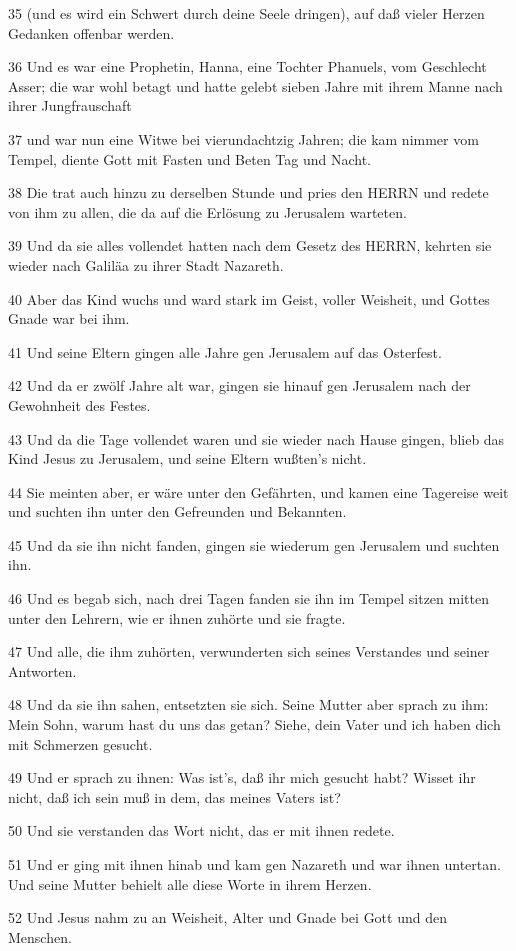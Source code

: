 \par 35 (und es wird ein Schwert durch deine Seele dringen), auf daß vieler Herzen Gedanken offenbar werden.
\par 36 Und es war eine Prophetin, Hanna, eine Tochter Phanuels, vom Geschlecht Asser; die war wohl betagt und hatte gelebt sieben Jahre mit ihrem Manne nach ihrer Jungfrauschaft
\par 37 und war nun eine Witwe bei vierundachtzig Jahren; die kam nimmer vom Tempel, diente Gott mit Fasten und Beten Tag und Nacht.
\par 38 Die trat auch hinzu zu derselben Stunde und pries den HERRN und redete von ihm zu allen, die da auf die Erlösung zu Jerusalem warteten.
\par 39 Und da sie alles vollendet hatten nach dem Gesetz des HERRN, kehrten sie wieder nach Galiläa zu ihrer Stadt Nazareth.
\par 40 Aber das Kind wuchs und ward stark im Geist, voller Weisheit, und Gottes Gnade war bei ihm.
\par 41 Und seine Eltern gingen alle Jahre gen Jerusalem auf das Osterfest.
\par 42 Und da er zwölf Jahre alt war, gingen sie hinauf gen Jerusalem nach der Gewohnheit des Festes.
\par 43 Und da die Tage vollendet waren und sie wieder nach Hause gingen, blieb das Kind Jesus zu Jerusalem, und seine Eltern wußten's nicht.
\par 44 Sie meinten aber, er wäre unter den Gefährten, und kamen eine Tagereise weit und suchten ihn unter den Gefreunden und Bekannten.
\par 45 Und da sie ihn nicht fanden, gingen sie wiederum gen Jerusalem und suchten ihn.
\par 46 Und es begab sich, nach drei Tagen fanden sie ihn im Tempel sitzen mitten unter den Lehrern, wie er ihnen zuhörte und sie fragte.
\par 47 Und alle, die ihm zuhörten, verwunderten sich seines Verstandes und seiner Antworten.
\par 48 Und da sie ihn sahen, entsetzten sie sich. Seine Mutter aber sprach zu ihm: Mein Sohn, warum hast du uns das getan? Siehe, dein Vater und ich haben dich mit Schmerzen gesucht.
\par 49 Und er sprach zu ihnen: Was ist's, daß ihr mich gesucht habt? Wisset ihr nicht, daß ich sein muß in dem, das meines Vaters ist?
\par 50 Und sie verstanden das Wort nicht, das er mit ihnen redete.
\par 51 Und er ging mit ihnen hinab und kam gen Nazareth und war ihnen untertan. Und seine Mutter behielt alle diese Worte in ihrem Herzen.
\par 52 Und Jesus nahm zu an Weisheit, Alter und Gnade bei Gott und den Menschen.


